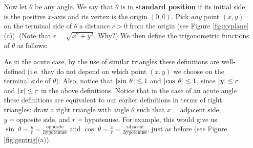 Now let $\theta$ be any angle. We say that $\theta$ is in \textbf{standard position} if its initial side is the positive $x$-axis and its vertex is the
origin $(0,0)$. Pick \emph{any} point $(x,y)$ on the terminal side of
$\theta$ a distance $r>0$ from the origin (see Figure \ref{fig:xyplane}(c)).
(Note that $r = \sqrt{ x^2 + y^2 }$. Why?) We then define the
trigonometric functions of $\theta$ as follows:

\begin{center}\end{center}

\par\noindent As in the acute case, by the use of similar triangles these definitions are
well-defined (i.e. they do not depend on which point $(x,y)$ we choose on the terminal side of
$\theta$). Also, notice that $\lvert\mspace{1mu}\sin\;\theta\mspace{1mu}\rvert \le 1$ and $\lvert\mspace{1mu}\cos\;\theta\mspace{1mu}\rvert \le 1$, since
$\lvert\mspace{1mu}y\mspace{1mu}\rvert \le r$ and $\lvert\mspace{1mu}x\mspace{1mu}\rvert \le r$ in the above definitions.
\newpage
Notice that in the case of an acute angle these definitions are equivalent to our earlier
definitions in terms of right triangles: draw a right triangle with angle $\theta$ such that
$x = \text{adjacent side}$, $y = \text{opposite side}$, and $r = \text{hypotenuse}$. For example,
this would give us $\sin\;\theta = \frac{y}{r} = \frac{\text{opposite}}{\text{hypotenuse}}$ and
$\cos\;\theta = \frac{x}{r} = \frac{\text{adjacent}}{\text{hypotenuse}}$, just as
before (see Figure \ref{fig:gentrig}(a)).\vspace{-2mm}

